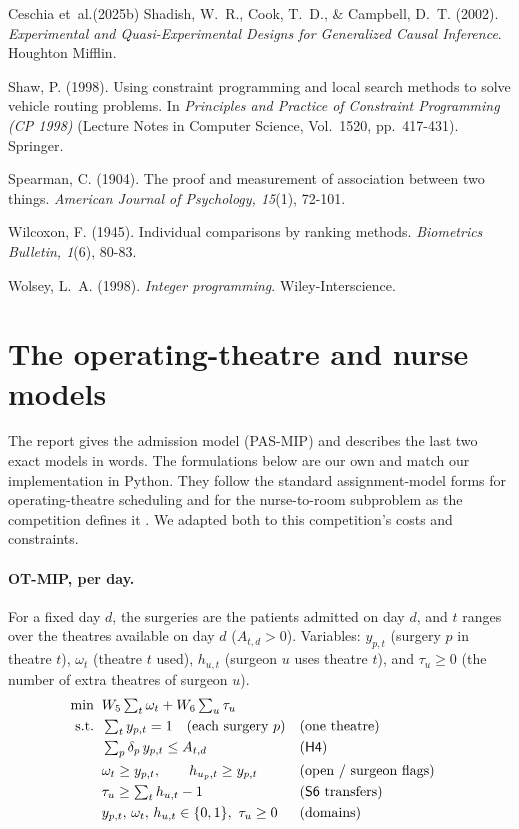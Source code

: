 \documentclass[11pt]{article}
\newcommand{\Sc}[1]{\textsf{S#1}}
\newcommand{\Hc}[1]{\textsf{H#1}}
\begin{document}
\begin{thebibliography}{Ceschia et~al.(2025b)}
		Shadish, W.~R., Cook, T.~D., \& Campbell, D.~T. (2002).
		\emph{Experimental and Quasi-Experimental Designs for Generalized Causal Inference}. Houghton Mifflin.

		Shaw, P. (1998).
		Using constraint programming and local search methods to solve vehicle routing problems.
		In \emph{Principles and Practice of Constraint Programming (CP 1998)}
		(Lecture Notes in Computer Science, Vol.~1520, pp.~417-431). Springer.

		Spearman, C. (1904).
		The proof and measurement of association between two things.
		\emph{American Journal of Psychology, 15}(1), 72-101.

		Wilcoxon, F. (1945).
		Individual comparisons by ranking methods.
		\emph{Biometrics Bulletin, 1}(6), 80-83.
		
		Wolsey, L.~A. (1998).
		\emph{Integer programming}. Wiley-Interscience.
		
	\end{thebibliography}
	
	\newpage
	\appendix
	\section{The operating-theatre and nurse models}\label{app:models}
	The report gives the admission model (PAS-MIP) and describes the last two exact models in
	words. The formulations below are our own and match our implementation in Python. They follow the standard assignment-model forms for operating-theatre scheduling \citep{cardoen2010} and for the nurse-to-room subproblem as the competition defines it \citep{ihtc2024paper}. We adapted both to this competition's costs and constraints.
	
	\paragraph{OT-MIP, per day.} For a fixed day $d$, the surgeries are the patients admitted on day
	$d$, and $t$ ranges over the theatres available on day $d$ ($A_{t,d}>0$). Variables: $y_{p,t}$ (surgery $p$ in theatre
	$t$), $\omega_t$ (theatre $t$ used), $h_{u,t}$ (surgeon $u$ uses theatre $t$), and $\tau_u\ge 0$
	(the number of extra theatres of surgeon $u$).
	{\small
		\begin{align*}
			\min\;\; & W_5\textstyle\sum_t \omega_t + W_6\sum_u \tau_u\\
			\text{s.t.}\;\;
			& \textstyle\sum_t y_{p,t}=1 \quad(\text{each surgery }p) && \text{(one theatre)}\\
			& \textstyle\sum_p \delta_p\,y_{p,t}\le A_{t,d} && \text{(\Hc4)}\\
			& \omega_t\ge y_{p,t},\qquad h_{u_p,t}\ge y_{p,t} && \text{(open / surgeon flags)}\\
			& \tau_u\ge \textstyle\sum_t h_{u,t}-1 && \text{(\Sc6 transfers)}\\
				& y_{p,t},\,\omega_t,\,h_{u,t}\in\{0,1\},\ \tau_u\ge 0 && \text{(domains)}
	\end{align*}}%
	
\end{document}
